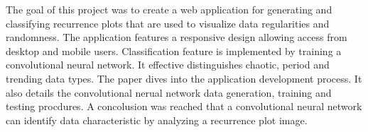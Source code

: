 The goal of this project was to create a web application for generating and classifying recurrence plots that are used to visualize data regularities and randomness.
The application features a responsive design allowing access from desktop and mobile users.
Classification feature is implemented by training a convolutional neural network.
It effective distinguishes chaotic, period and trending data types.
The paper dives into the application development process.
It also details the convolutional nerual network data generation, training and testing procdures.
A concolusion was reached that a convolutional neural network can identify data characteristic by analyzing a recurrence plot image.